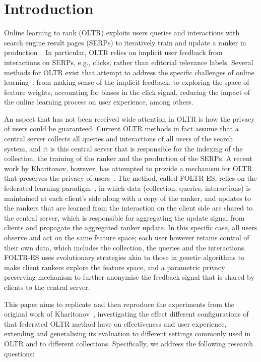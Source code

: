 \section{Introduction}

Online learning to rank (OLTR) exploits users queries and interactions with search engine result pages (SERPs) to iteratively train and update a ranker in  production~\cite{bibid}. In particular, OLTR relies on implicit user feedback from interactions on SERPs, e.g., clicks, rather than editorial relevance labels. 
Several methods for OLTR exist that attempt to address the specific challenges of online learning~\cite{bibid}: from making sense of the implicit feedback, to exploring the space of feature weights, accounting for biases in the click signal, reducing the impact of the online learning process on user experience, among others. 

An aspect that has not been received wide attention in OLTR is how the privacy of users could be guaranteed. Current OLTR methods in fact assume that a central server collects all queries and interactions of all users of the search system, and it is this central server that is responsible for the indexing of the collection, the training of the ranker and the production of the SERPs. A recent work by Kharitonov, however, has attempted to provide a mechanism for OLTR that preserves the privacy of users~\cite{kharitonov2019federated}. The method, called FOLTR-ES, relies on the federated learning paradigm~\cite{bibid}, in which data (collection, queries, interactions) is maintained at each client's side along with a copy of the ranker, and updates to the rankers that are learned from the interaction on the client side are shared to the central server, which is responsible for aggregating the update signal from clients and propagate the aggregated ranker update. In this specific case, all users observe and act on the same feature space; each user however retains control of their own data, which includes the collection, the queries and the interactions. FOLTR-ES uses evolutionary strategies akin to those in genetic algorithms to make client rankers explore the feature space, and a parametric privacy preserving mechanism to further anonymise the feedback signal that is shared by clients to the central server.  


This paper aims to replicate and then reproduce the experiments from the original work of Kharitonov~\cite{kharitonov2019federated}, investigating the effect different configurations of that federated OLTR method have on effectiveness and user experience, extending and generalising its evaluation to different settings commonly used in OLTR and to different collections. Specifically, we address the following research questions:

